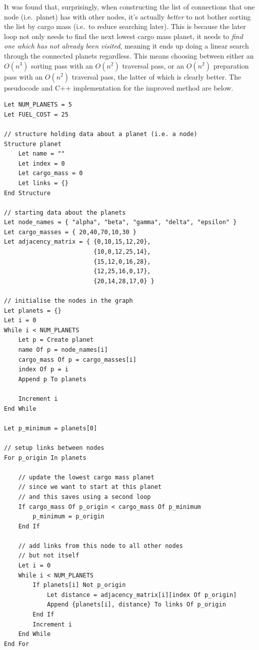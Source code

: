 \documentclass[
]{article}
\begin{document}
It was found that, surprisingly, when constructing the list of
connections that one node (i.e.~planet) has with other nodes, it's
actually \emph{better} to not bother sorting the list by cargo mass
(i.e.~to reduce searching later). This is because the later loop not
only needs to find the next lowest cargo mass planet, it needs to
\emph{find one which has not already been visited}, meaning it ends up
doing a linear search through the connected planets regardless. This
means choosing between either an \(O(n^3)\) sorting pass with an
\(O(n^2)\) traversal pass, or an \(O(n^2)\) preparation pass with an
\(O(n^2)\) traversal pass, the latter of which is clearly better. The
pseudocode and C++ implementation for the improved method are below.

\begin{verbatim}
Let NUM_PLANETS = 5
Let FUEL_COST = 25

// structure holding data about a planet (i.e. a node)
Structure planet
    Let name = ""
    Let index = 0
    Let cargo_mass = 0
    Let links = {}
End Structure

// starting data about the planets
Let node_names = { "alpha", "beta", "gamma", "delta", "epsilon" }
Let cargo_masses = { 20,40,70,10,30 }
Let adjacency_matrix = { {0,10,15,12,20}, 
                         {10,0,12,25,14}, 
                         {15,12,0,16,28}, 
                         {12,25,16,0,17}, 
                         {20,14,28,17,0} }

// initialise the nodes in the graph
Let planets = {}
Let i = 0
While i < NUM_PLANETS
    Let p = Create planet
    name Of p = node_names[i]
    cargo_mass Of p = cargo_masses[i]
    index Of p = i
    Append p To planets
    
    Increment i
End While

Let p_minimum = planets[0]

// setup links between nodes
For p_origin In planets

    // update the lowest cargo mass planet
    // since we want to start at this planet
    // and this saves using a second loop
    If cargo_mass Of p_origin < cargo_mass Of p_minimum
        p_minimum = p_origin
    End If

    // add links from this node to all other nodes
    // but not itself
    Let i = 0
    While i < NUM_PLANETS
        If planets[i] Not p_origin
            Let distance = adjacency_matrix[i][index Of p_origin]
            Append {planets[i], distance} To links Of p_origin
        End If
        Increment i
    End While
End For


\end{verbatim}
\end{document}
